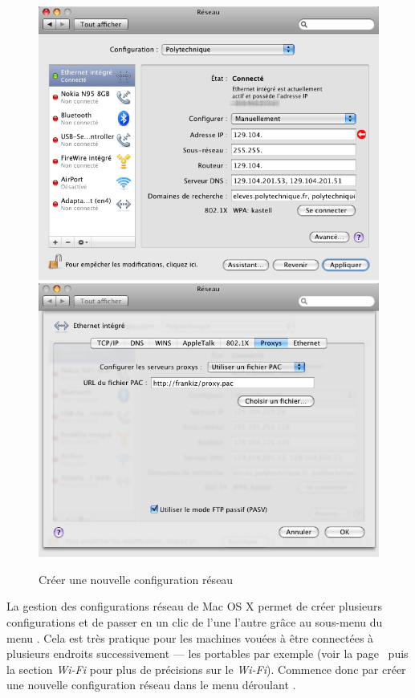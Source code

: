 \begin{figure}[p]
\begin{center}
{\begin{minipage}{0.43 \textwidth}
\begin{flushright}
 		{\includegraphics[width=0.96 \textwidth]{images/mac_config_ip_leopard}} \\
 		{\includegraphics[width=0.96 \textwidth]{images/mac_config_proxy_leopard}}
\end{flushright}
 		\end{minipage}
 		 	\label{config:mac:ip:leopard}	}
     	 \caption{Créer une nouvelle configuration réseau}

    \end{center}
  \end{figure}

La gestion des configurations réseau de Mac OS X permet de créer plusieurs configurations et de passer en un clic de l'une  l'autre grâce au sous-menu  du menu . Cela est très pratique pour les machines vouées à être connectées à plusieurs endroits successivement --- les portables par exemple (voir la page~\pageref{wifi} puis la section \emph{Wi-Fi} pour plus de précisions sur le \emph{Wi-Fi}). Commence donc par créer une nouvelle configuration réseau dans le menu déroulant .



